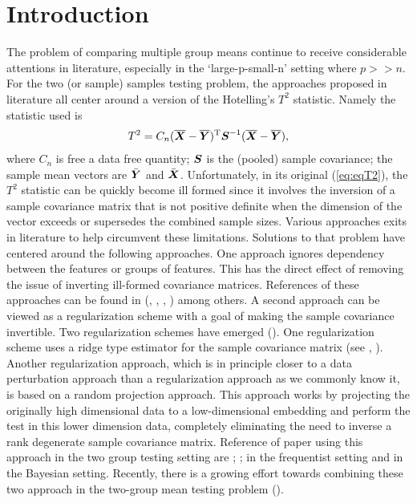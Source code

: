 \documentclass[12pt]{article}
\theoremstyle{plain}%
\theoremstyle{definition}
\def\be{\begin{eqnarray}}
\def\ee{\end{eqnarray}}
\def\trans{^{\rm T}}
\newcommand{\uS}       {\mbox{\boldmath$S$}}
\newcommand{\uX}       {\mbox{\boldmath$X$}}
\newcommand{\uY}       {\mbox{\boldmath$Y$}}
\begin{document}


\section{Introduction} \label{sec:intro}
The problem of comparing multiple group means continue to receive considerable attentions in literature, especially in the ‘large-p-small-n’ setting where $p >> n$. For the two (or sample) samples testing problem, the approaches proposed in literature all center around a version of the Hotelling's $T^2$ statistic. Namely the statistic used is
\be
T^{2} = C_{n}(\overline{\uX} - \overline{\uY})\trans\uS^{-1} (\overline{\uX} - \overline{\uY}), \label{eq:eqT2}
\ee
where $C_{n}$ is free a data free quantity; $\uS$ is the (pooled) sample covariance; the sample mean vectors are $\bar{\uY}$ and $\bar{\uX}$.
Unfortunately, in its original (\ref{eq:eqT2}), the $T^2$ statistic can be quickly become ill formed since it involves the inversion of a sample covariance matrix that is not positive definite when the dimension of the vector exceeds or supersedes the combined sample sizes. Various approaches exits in literature to help circumvent these limitations. Solutions to that problem have centered around the following approaches. One approach ignores dependency between the features or groups of features. This has the direct effect of removing the issue of inverting ill-formed covariance matrices. References of these approaches can be found in (\citealp{bai1996effect}, \citealp{chen2010two}, \citealp{ahmad2014u}, \citealp{feng2017composite}) among others. A second approach can be viewed as a regularization scheme with a goal of making the sample covariance invertible. Two regularization schemes have emerged (\citealp{hu2020pairwise}). One regularization scheme uses a ridge type estimator for the sample covariance matrix (see \citealp{chen2011regularized}, \citealp{li2020adaptable}). Another regularization approach, which is in principle closer to a data perturbation approach than a regularization approach as we commonly know it, is based on a random projection approach. This approach works by projecting the originally high dimensional data to a low-dimensional embedding and perform the test in this lower dimension data, completely eliminating the need to inverse a rank degenerate sample covariance matrix. Reference of paper using this approach in the two group testing setting are \cite{lopes2011more}; \cite{thulin2014high}; \cite{srivastava2014raptt} in the frequentist setting and \cite{zoh2018powerful} in the Bayesian setting. Recently, there is a growing effort towards combining these two approach in the two-group mean testing problem (\citealp{hu2020pairwise}).
\end{document}
